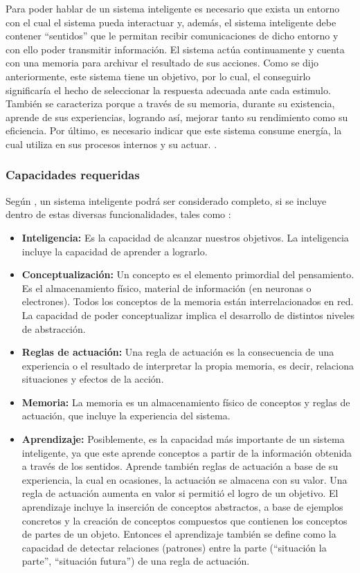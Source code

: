 Para poder hablar de un sistema inteligente es necesario que exista un entorno con el cual el sistema pueda interactuar y, además, el sistema inteligente debe contener ``sentidos'' que le permitan recibir comunicaciones de dicho entorno y con ello poder transmitir información. El sistema actúa continuamente   y cuenta con una memoria para archivar el resultado de sus acciones. 
Como se dijo anteriormente, este sistema tiene un objetivo, por lo cual, el conseguirlo significaría el hecho de seleccionar la respuesta adecuada ante cada estimulo. También se caracteriza porque a través de su memoria, durante su existencia, aprende de sus experiencias, logrando así, mejorar tanto su rendimiento como su eficiencia. Por último, es necesario indicar que este sistema consume energía, la cual   utiliza en sus procesos internos y su actuar. \citep{Alejandro2017}.

\subsubsection{Capacidades requeridas}
Según \cite{Alejandro2017}, un sistema inteligente podrá ser considerado completo, si se incluye dentro de estas diversas funcionalidades, tales como :

\begin{itemize}
\item \textbf{Inteligencia:} Es la capacidad de alcanzar nuestros objetivos.  La inteligencia incluye la capacidad de aprender a lograrlo. 
\item \textbf{Conceptualización:} Un concepto es el elemento primordial del pensamiento. Es el almacenamiento físico, material de información (en neuronas o electrones). Todos los conceptos de la memoria están interrelacionados en red. La capacidad de poder conceptualizar implica el desarrollo de distintos niveles de abstracción.
\item \textbf{Reglas de actuación:} Una regla de actuación es la consecuencia de una experiencia o el resultado de interpretar la propia memoria, es decir, relaciona situaciones y efectos de la acción.
\item \textbf{Memoria:} La memoria es un almacenamiento físico de conceptos y reglas de actuación, que incluye la experiencia del sistema.
\item \textbf{Aprendizaje:} Posiblemente, es la capacidad más importante de un sistema inteligente, ya que este aprende conceptos a partir de la información obtenida a través de los sentidos. Aprende también reglas de actuación a base de su experiencia, la cual en ocasiones, la actuación se almacena con su valor. Una regla de actuación aumenta en valor si permitió el logro de un objetivo. El aprendizaje incluye la inserción de conceptos abstractos, a base de ejemplos concretos y la creación de conceptos compuestos que contienen los conceptos de partes de un objeto. Entonces el aprendizaje también se define como la capacidad de detectar relaciones (patrones) entre la parte (``situación la parte'', ``situación futura'') de una regla de actuación.
\end{itemize}

